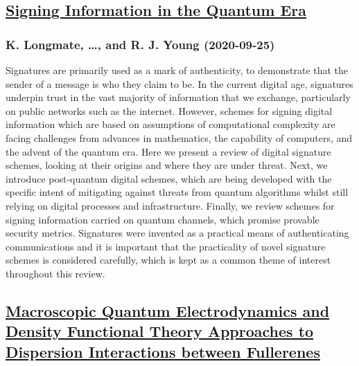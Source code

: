 \subsection*{\href{http://arxiv.org/abs/2009.12118v1}{Signing Information in the Quantum Era}}
\subsubsection*{K. Longmate, \dots, and R. J. Young (2020-09-25)}
Signatures are primarily used as a mark of authenticity, to demonstrate that
the sender of a message is who they claim to be. In the current digital age,
signatures underpin trust in the vast majority of information that we exchange,
particularly on public networks such as the internet. However, schemes for
signing digital information which are based on assumptions of computational
complexity are facing challenges from advances in mathematics, the capability
of computers, and the advent of the quantum era. Here we present a review of
digital signature schemes, looking at their origins and where they are under
threat. Next, we introduce post-quantum digital schemes, which are being
developed with the specific intent of mitigating against threats from quantum
algorithms whilst still relying on digital processes and infrastructure.
Finally, we review schemes for signing information carried on quantum channels,
which promise provable security metrics. Signatures were invented as a
practical means of authenticating communications and it is important that the
practicality of novel signature schemes is considered carefully, which is kept
as a common theme of interest throughout this review.

\subsection*{\href{http://arxiv.org/abs/2009.12104v1}{Macroscopic Quantum Electrodynamics and Density Functional Theory  Approaches to Dispersion Interactions between Fullerenes}}
